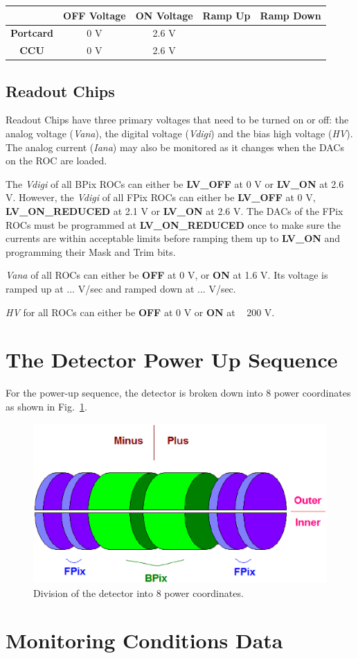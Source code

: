 \documentclass{cmspaper}
\begin{document}
\begin{table}[htb]
	\centering
		\begin{tabular}{|c|c|c|c|c|}
			\hline
			                  & \textbf{OFF Voltage} & \textbf{ON Voltage} & \textbf{Ramp Up} & \textbf{Ramp Down} \\
 \hline
		  \textbf{Portcard} &    0 V      &     2.6 V     &         &            \\
\hline
		  \textbf{CCU}      &    0 V      &     2.6 V     &         &            \\
		  \hline
		\end{tabular}
\end{table}

\subsection{Readout Chips}

Readout Chips have three primary voltages that need to be turned on or off: the analog voltage (\emph{Vana}), the digital voltage (\emph{Vdigi}) and the bias high voltage (\emph{HV}). The analog current (\emph{Iana}) may also be monitored as it changes when the DACs on the ROC are loaded.

The \emph{Vdigi} of all BPix ROCs can either be \textbf{LV\_OFF} at 0 V or \textbf{LV\_ON} at 2.6 V. However, the \emph{Vdigi} of all FPix ROCs can either be \textbf{LV\_OFF} at 0 V, \textbf{LV\_ON\_REDUCED} at 2.1 V or \textbf{LV\_ON} at 2.6 V. The DACs of the FPix ROCs must be programmed at \textbf{LV\_ON\_REDUCED} once to make sure the currents are within acceptable limits before ramping them up to \textbf{LV\_ON} and programming their Mask and Trim bits.

\emph{Vana} of all ROCs can either be \textbf{OFF} at 0 V, or \textbf{ON} at 1.6 V. Its voltage is ramped up at ... V/sec and ramped down at ... V/sec.

\emph{HV} for all ROCs can either be \textbf{OFF} at 0 V or \textbf{ON} at ~ 200 V.

\section{The Detector Power Up Sequence}

For the power-up sequence, the detector is broken down into 8 power coordinates as shown in Fig.~\ref{fig:powerPartition}.

\begin{figure}[h]
\centering
\includegraphics[width=0.75\linewidth]{powerPartition.eps}
\caption{Division of the detector into 8 power coordinates.}
\label{fig:powerPartition}
\end{figure}




\section{Monitoring Conditions Data}
\end{document}
